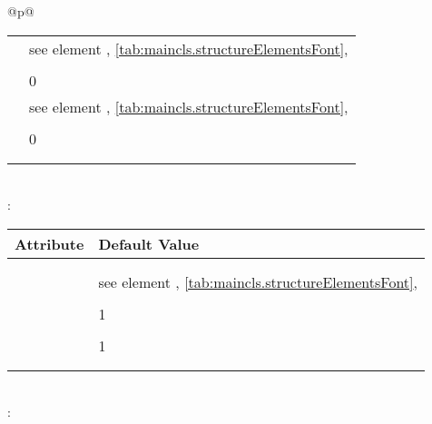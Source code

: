 \begin{longtable}{@{}p{\columnwidth}@{}}
\begin{tabularx}{\linewidth}{ll}
    \PValue{font}        & see element \FontElement{chapter},
                           \autoref{tab:maincls.structureElementsFont}, 
                           \autopageref{tab:maincls.structureElementsFont} \\
    \PValue{innerskip}   & \PValue{0pt} \\
    \PValue{level}       & 0 \\
    \PValue{prefixfont}  & see element \FontElement{chapterprefix},
                           \autoref{tab:maincls.structureElementsFont}, 
                           \autopageref{tab:maincls.structureElementsFont} \\
    \PValue{tocindent}   & \PValue{0pt} \\
    \PValue{toclevel}    & 0 \\
    \PValue{tocnumwidth} & \PValue{1.5em} \\
    \PValue{tocstyle}    & \PValue{chapter} \\
    \bottomrule
    \end{tabularx} \\
    \addlinespace[\normalbaselineskip]
    : \\*
    \begin{tabularx}{\linewidth}{ll}
    \toprule
    Attribute & Default Value \\
    \midrule
    \PValue{afterskip}   & \PValue{2.3ex plus .2ex} \\
    \PValue{beforeskip}  & \PValue{-3.5ex plus -1ex minus -.2ex} \\
    \PValue{font}        & see element \FontElement{section},
                           \autoref{tab:maincls.structureElementsFont}, 
                           \autopageref{tab:maincls.structureElementsFont} \\
    \PValue{indent}      & \PValue{0pt} \\
    \PValue{level}       & 1 \\
    \PValue{tocindent}   & \PValue{1.5em}\\
    \PValue{toclevel}    & 1 \\
    \PValue{tocnumwidth} & \PValue{2.3em}\\
    \PValue{tocstyle}    & \PValue{section} \\
    \bottomrule
    \end{tabularx} \\
    \addlinespace[\normalbaselineskip]
    : \\*
    \begin{tabularx}{\linewidth}{ll}

\end{tabularx}
\end{longtable}
